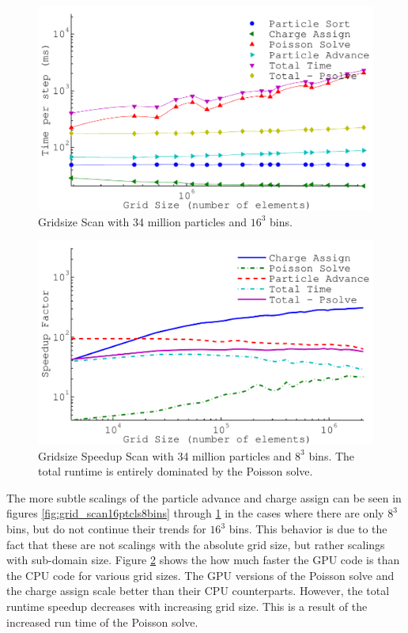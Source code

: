 \begin{figure}
\begin{center}
\includegraphics[width=6in]{performance/gridsize_scan34ptcls16bins.pdf}
\end{center}
\caption[Gridsize Scan with 34 million particles and $16^3$ bins.]{Gridsize Scan with 34 million particles and $16^3$ bins.}
\label{fig:grid_scan34ptcls16bins}
\end{figure}

\begin{figure}
\begin{center}
\includegraphics[width=6in]{performance/gridsize_speedup_scan.pdf}
\end{center}
\caption[Gridsize Speedup Scan with 34 million particles and $8^3$ bins]{Gridsize Speedup Scan with 34 million particles and $8^3$ bins. The total runtime is entirely dominated by the Poisson solve.}
\label{fig:grid_speedupscan}
\end{figure}

The more subtle scalings of the particle advance and charge assign can be seen in figures \ref{fig:grid_scan16ptcls8bins} through \ref{fig:grid_scan34ptcls16bins} in the cases where there are only $8^3$ bins, but do not continue their trends for $16^3$ bins. This behavior is due to the fact that these are not scalings with the absolute grid size, but rather scalings with sub-domain size. Figure \ref{fig:grid_speedupscan} shows the how much faster the GPU code is than the CPU code for various grid sizes. The GPU versions of the Poisson solve and the charge assign scale better than their CPU counterparts. However, the total runtime speedup decreases with increasing grid size. This is a result of the increased run time of the Poisson solve.

